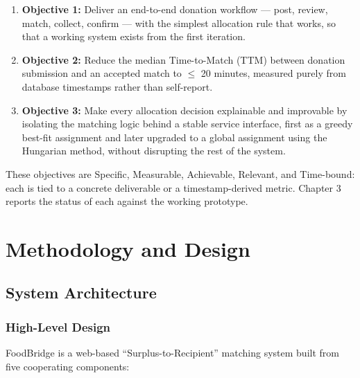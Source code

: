 \documentclass[12pt,a4paper]{report}
\begin{document}
\begin{enumerate}[leftmargin=*]
    \item \textbf{Objective 1:} Deliver an end-to-end donation workflow --- post, review, match, collect, confirm --- with the simplest allocation rule that works, so that a working system exists from the first iteration.
    \item \textbf{Objective 2:} Reduce the median Time-to-Match (TTM) between donation submission and an accepted match to $\leq$ 20 minutes, measured purely from database timestamps rather than self-report.
    \item \textbf{Objective 3:} Make every allocation decision explainable and improvable by isolating the matching logic behind a stable service interface, first as a greedy best-fit assignment and later upgraded to a global assignment using the Hungarian method, without disrupting the rest of the system.
\end{enumerate}

These objectives are Specific, Measurable, Achievable, Relevant, and Time-bound: each is tied to a concrete deliverable or a timestamp-derived metric. Chapter 3 reports the status of each against the working prototype.

\chapter{Methodology and Design}

\section{System Architecture}

\subsection{High-Level Design}

FoodBridge is a web-based ``Surplus-to-Recipient'' matching system built from five cooperating components:
\end{document}
